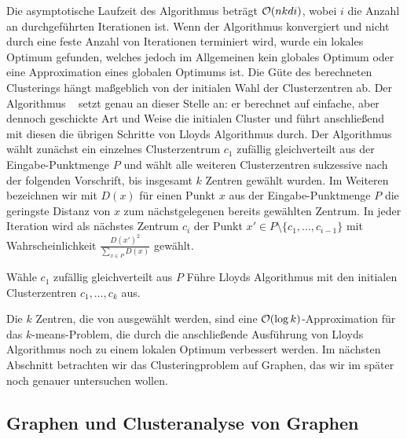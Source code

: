 Die asymptotische Laufzeit des Algorithmus beträgt $\mathcal{O}(nkdi)$, wobei $i$ die Anzahl an durchgeführten Iterationen ist.
Wenn der Algorithmus konvergiert und nicht durch eine feste Anzahl von Iterationen terminiert wird, wurde ein lokales
Optimum gefunden, welches jedoch im Allgemeinen kein globales Optimum oder eine Approximation eines globalen Optimums ist.
Die Güte des berechneten Clusterings hängt maßgeblich von der initialen Wahl der Clusterzentren ab. Der Algorithmus
\kmpp~\cite{ArthurV07} setzt genau an dieser Stelle an: er berechnet auf einfache, aber dennoch geschickte Art und Weise
die initialen Cluster und führt anschließend mit diesen die übrigen Schritte von Lloyds Algorithmus durch.
Der Algorithmus wählt zunächst ein einzelnes Clusterzentrum $c_1$ zufällig gleichverteilt aus der Eingabe-Punktmenge $P$ und
wählt alle weiteren Clusterzentren sukzessive nach der folgenden Vorschrift, bis insgesamt $k$ Zentren gewählt wurden.
Im Weiteren bezeichnen wir mit $D(x)$ für einen Punkt $x$ aus der Eingabe-Punktmenge $P$ die geringste Distanz von $x$ zum
nächstgelegenen bereits gewählten Zentrum. In jeder Iteration wird als nächstes Zentrum $c_i$ der Punkt
$x' \in P \setminus \{ c_1, \dots, c_{i-1} \}$ mit Wahrscheinlichkeit $\frac{D(x')^2}{\sum_{x \in P} D(x)}$ gewählt.

\begin{algorithm}[H]
\label{algo:kmeanspp}
\caption{\kmpp}
	\DontPrintSemicolon
	
	\BlankLine
	
	Wähle $c_1$ zufällig gleichverteilt aus $P$\;
	Führe Lloyds Algorithmus mit den initialen Clusterzentren $c_1, \dots, c_k$ aus.
\end{algorithm}
Die $k$ Zentren, die von \kmpp{} ausgewählt werden, sind eine $\mathcal{O}(\log k)$-Approximation für das $k$-means-Problem, die durch
die anschließende Ausführung von Lloyds Algorithmus noch zu einem lokalen Optimum verbessert werden.
\absatz
Im nächsten Abschnitt betrachten wir das Clusteringproblem auf Graphen, das wir im später noch genauer untersuchen wollen.

\subsection{Graphen und Clusteranalyse von Graphen}
\label{subsection:basics:graphs}

